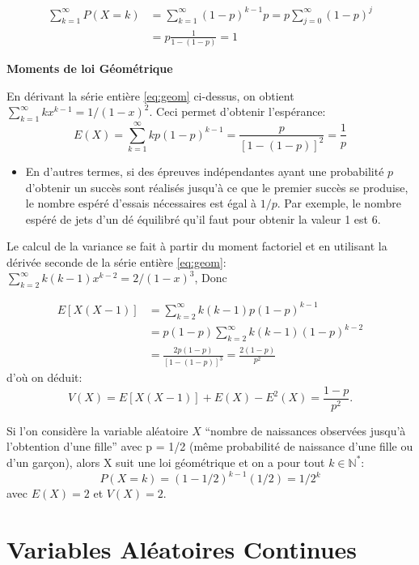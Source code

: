 \documentclass[]{book}
\providecommand{\tightlist}{%
  \setlength{\itemsep}{0pt}\setlength{\parskip}{0pt}}
\theoremstyle{magentacolor}
\theoremstyle{proprie}
\theoremstyle{exstyle}
\theoremstyle{exostyle}
\theoremstyle{definition}
\theoremstyle{definition}
\theoremstyle{definition}
\theoremstyle{remark}
\begin{document}
\[\begin{aligned}
\sum_{k=1}^\infty P(X=k)&= \sum_{k=1}^\infty (1-p)^{k-1}p = p \sum_{j=0}^\infty (1-p)^{j} \\
&= p \frac{1}{1-(1-p)}=1\end{aligned}\]

\textbf{Moments de loi Géométrique}

En dérivant la série entière
\eqref{eq:geom} ci-dessus, on obtient
\(\sum_{k=1}^\infty k x^{k-1}=1/(1-x)^2\). Ceci permet d'obtenir
l'espérance:
\[E(X)=\sum_{k=1}^\infty kp(1-p)^{k-1}=\frac{p}{[1-(1-p)]^2}=\frac{1}{p}\]

\begin{itemize}
\tightlist
\item
  En d'autres termes, si des épreuves indépendantes ayant une
  probabilité \(p\) d'obtenir un succès sont réalisés jusqu'à ce que le
  premier succès se produise, le nombre espéré d'essais nécessaires
  est égal à \(1/p\). Par exemple, le nombre espéré de jets d'un dé
  équilibré qu'il faut pour obtenir la valeur 1 est 6.
\end{itemize}

Le calcul de la variance se fait à partir du moment factoriel et en
utilisant la dérivée seconde de la série entière
\eqref{eq:geom}:
\(\sum_{k=2}^\infty k(k-1) x^{k-2} = 2/(1-x)^3\), Donc

\[\begin{aligned}
E[X(X-1)]&=\sum_{k=2}^\infty k(k-1)p(1-p)^{k-1} \\ &= p(1-p)\sum_{k=2}^\infty k(k-1)(1-p)^{k-2} \\
&=  \frac{2p(1-p)}{[1-(1-p)]^3}=\frac{2(1-p)}{p^2}\end{aligned}\] d'où
on déduit: \[V(X)=E[X(X-1)]+E(X)-E^2(X)=\frac{1-p}{p^2}.\]

Si l'on considère la variable aléatoire \(X\) ``nombre de naissances
observées jusqu'à l'obtention d'une fille'' avec p = 1/2 (même
probabilité de naissance d'une fille ou d'un garçon), alors X suit une
loi géométrique et on a pour tout \(k\in \mathbb{N^*}\):
\[P(X=k)=(1-1/2)^{k-1}(1/2)=1/2^k\] avec \(E(X)=2\) et \(V(X)=2.\)

\hypertarget{variables-aleatoires-continues}{%
\chapter*{Variables Aléatoires Continues}\label{variables-aleatoires-continues}}
\end{document}
